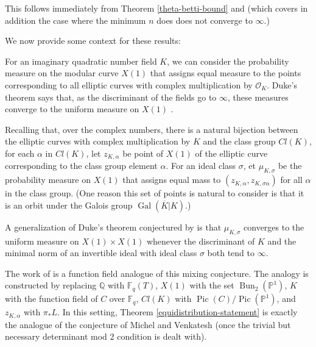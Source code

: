 This follows immediately from Theorem \ref{theta-betti-bound} and \citep[Theorem 4.4]{TS} (which covers in addition the case where the minimum $n$ does does not converge to $\infty$.)

We now provide some context for these results:

For an imaginary quadratic number field $K$, we can consider the probability measure on the modular curve $X(1)$ that assigns equal measure to the points corresponding to all elliptic curves with complex multiplication by $\mathcal O_K$. Duke's theorem says that, as the discriminant of the fields go to $\infty$, these measures converge to the uniform measure on $X(1)$ \citep{Duke}.

Recalling that, over the complex numbers, there is a natural bijection between the elliptic curves with complex multiplication by $K$ and the class group $Cl(K)$, for each $\alpha$ in $Cl(K)$, let $z_{K,\alpha}$ be point of $X(1)$ of the elliptic curve corresponding to the class group element $\alpha$. For an ideal class $\sigma$, et $\mu_{K,\sigma}$ be the probability measure on $X(1)$ that assigns equal mass to $(z_{K,\alpha}, z_{K, \sigma\alpha})$ for all $\alpha$ in the class group. (One reason this set of points is natural to consider is that it is an orbit under the Galois group $\operatorname{Gal}(\overline{K}|K)$.)

A generalization of Duke's theorem conjectured by \citet[Conjecture 2 on p. 7]{MVUnpublished} is that $\mu_{K,\sigma}$ converges to the uniform measure on $X(1) \times X(1)$ whenever the discriminant of $K$ and the minimal norm of an
invertible ideal with ideal class $\sigma$ both tend to $\infty$.

The work of \citet{TS} is a function field analogue of this mixing conjecture. The analogy is constructed by replacing $\mathbb Q$ with $\mathbb F_q(T)$, $X(1)$ with the set $\operatorname{Bun}_2(\mathbb P^1)$, $K$ with the function field of $C$ over $\mathbb F_q$, $Cl(K)$ with $\operatorname{Pic}(C) / \operatorname{Pic}( \mathbb P^1)$, and $z_{K,\alpha}$ with $\pi_* L$. In this setting, Theorem \ref{equidistribution-statement} is exactly the analogue of the conjecture of Michel and Venkatesh (once the trivial but necessary determinant mod $2$ condition is dealt with).

